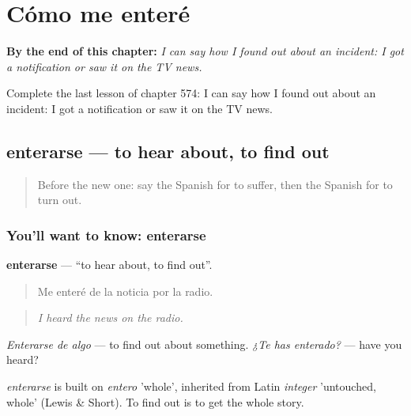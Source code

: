
\chapter{Cómo me enteré}
\label{ch:es-como-me-entere}

\begin{chapteropening}
\textbf{By the end of this chapter:} \emph{I can say how I found out about an incident: I got a notification or saw it on the TV news.}

Complete the last lesson of chapter 574: I can say how I found out about an incident: I got a notification or saw it on the TV news.
\end{chapteropening}

\section[enterarse]{enterarse — to hear about, to find out}

\label{lesson:ES-C574-enterarse}



\begin{quote}
Before the new one: say the Spanish for to suffer, then the Spanish for to turn out.
\end{quote}

\subsection*{You'll want to know: enterarse}
\textbf{enterarse} — \textquotedblleft{}to hear about, to find out\textquotedblright{}.

\begin{quote}
Me enteré de la noticia por la radio.
\end{quote}

\begin{quote}
\emph{I heard the news on the radio.}
\end{quote}

\emph{Enterarse de algo} — to find out about something. \emph{¿Te has enterado?} — have you heard?

\begin{cousinweb}
\emph{enterarse} is built on \emph{entero} 'whole', inherited from Latin \emph{integer} 'untouched, whole' (Lewis \& Short). To find out is to get the whole story.
\end{cousinweb}

